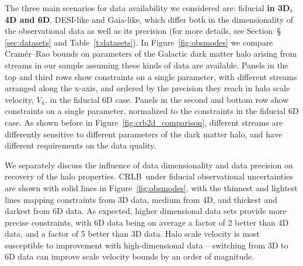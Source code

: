 \documentclass[modern]{aastex62}
\newcommand{\acronym}[1]{{\small{#1}}}
\newcommand{\CRLB}{\acronym{CRLB}}
\begin{document}
The three main scenarios for data availability we considered are: fiducial {\bf in 3D, 4D and 6D}, DESI-like and Gaia-like, which differ both in the dimensionality of the observational data as well as its precision (for more details, see Section~\S\,\ref{sec:datasets} and Table~\ref{t:datasets}).
In Figure~\ref{fig:obsmodes} we compare Cram\'er--Rao bounds on parameters of the Galactic dark matter halo arising from streams in our sample assuming these kinds of data are available.
Panels in the top and third rows show constraints on a single parameter, with different streams arranged along the x-axis, and ordered by the precision they reach in halo scale velocity, $V_h$, in the fiducial 6D case.
Panels in the second and bottom row show constraints on a single parameter, normalized to the constraints in the fiducial 6D case.
As shown before in Figure~\ref{fig:crb2d_comparison}, different streams are differently sensitive to different parameters of the dark matter halo, and have different requirements on the data quality.

We separately discuss the influence of data dimensionality and data precision on recovery of the halo properties.
\CRLB\ under fiducial observational uncertainties are shown with solid lines in Figure~\ref{fig:obsmodes}, with the thinnest and lightest lines mapping constraints from 3D data, medium from 4D, and thickest and darkest from 6D data.
As expected, higher dimensional data sets provide more precise constraints, with 6D data being on average a factor of 2 better than 4D data, and a factor of 5 better than 3D data.
Halo scale velocity is most susceptible to improvement with high-dimensional data -- switching from 3D to 6D data can improve scale velocity bounds by an order of magnitude.
\end{document}

